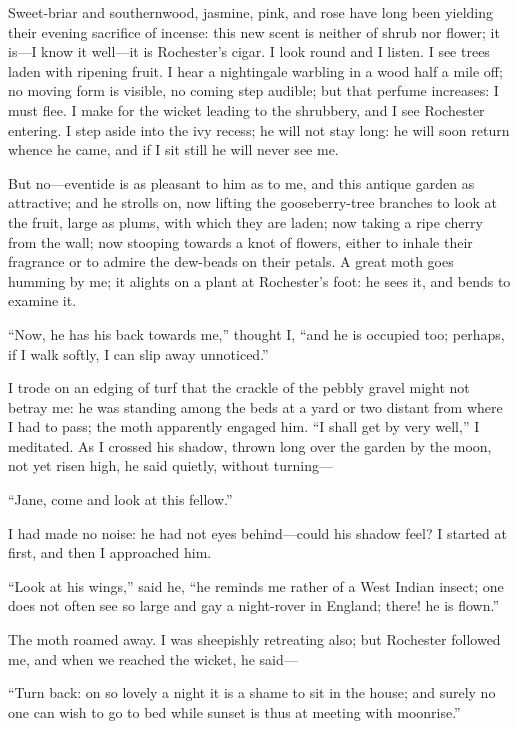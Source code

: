 Sweet-briar and southernwood, jasmine, pink, and rose have long been
yielding their evening sacrifice of incense: this new scent is neither
of shrub nor flower; it is---I know it well---it is \Mr{} Rochester's
cigar. I look round and I listen. I see trees laden with ripening
fruit. I hear a nightingale warbling in a wood half a mile off; no
moving form is visible, no coming step audible; but that perfume
increases: I must flee. I make for the wicket leading to the shrubbery,
and I see \Mr{} Rochester entering. I step aside into the ivy recess; he
will not stay long: he will soon return whence he came, and if I sit
still he will never see me.

But no---eventide is as pleasant to him as to me, and this antique
garden as attractive; and he strolls on, now lifting the gooseberry-tree
branches to look at the fruit, large as plums, with which they are
laden; now taking a ripe cherry from the wall; now stooping towards a
knot of flowers, either to inhale their fragrance or to admire the
dew-beads on their petals. A great moth goes humming by me; it alights
on a plant at \Mr{} Rochester's foot: he sees it, and bends to examine it.

\enquote{Now, he has his back towards me,} thought I, \enquote{and he is
occupied too; perhaps, if I walk softly, I can slip away unnoticed.}

I trode on an edging of turf that the crackle of the pebbly gravel might
not betray me: he was standing among the beds at a yard or two distant
from where I had to pass; the moth apparently engaged him. \enquote{I
shall get by very well,} I meditated. As I crossed his shadow, thrown
long over the garden by the moon, not yet risen high, he said quietly,
without turning---

\enquote{Jane, come and look at this fellow.}

I had made no noise: he had not eyes behind---could his shadow feel? I
started at first, and then I approached him.

\enquote{Look at his wings,} said he, \enquote{he reminds me rather of a
West Indian insect; one does not often see so large and gay a
night-rover in England; there! he is flown.}

The moth roamed away. I was sheepishly retreating also; but \Mr{}
 Rochester followed me, and when we reached the wicket, he said---

\enquote{Turn back: on so lovely a night it is a shame to sit in the
house; and surely no one can wish to go to bed while sunset is thus at
meeting with moonrise.}

